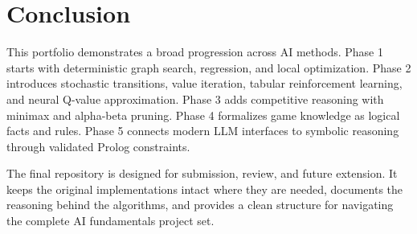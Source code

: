 \documentclass[11pt,a4paper]{article}
\begin{document}
\section{Conclusion}

This portfolio demonstrates a broad progression across AI methods. Phase 1 starts with deterministic graph search, regression, and local optimization. Phase 2 introduces stochastic transitions, value iteration, tabular reinforcement learning, and neural Q-value approximation. Phase 3 adds competitive reasoning with minimax and alpha-beta pruning. Phase 4 formalizes game knowledge as logical facts and rules. Phase 5 connects modern LLM interfaces to symbolic reasoning through validated Prolog constraints.

The final repository is designed for submission, review, and future extension. It keeps the original implementations intact where they are needed, documents the reasoning behind the algorithms, and provides a clean structure for navigating the complete AI fundamentals project set.
\end{document}
